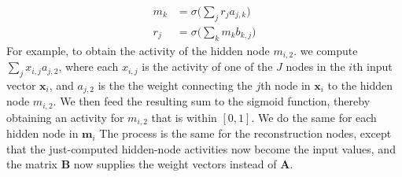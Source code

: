 \begin{align}
\label{eq:sig-m-ac}
m_{k} &= \sigma\big(\sum_{j} r_{j} a_{j,k}\big) \\
\label{eq:sig-r-ac}
r_{j} &= \sigma\big(\sum_{k}  m_{k} b_{k,j} \big)
\end{align}
For example, to obtain the activity of the hidden node $m_{i,2}$.
we compute $\sum_{j} x_{i,j} a_{j,2}$, where each $x_{i,j}$ is the activity of one of the $J$ nodes in the $i$th input vector $\textbf{x}_i$, and $a_{j,2}$ is the the weight connecting the $j$th node in $\textbf{x}_i$ to the hidden node $m_{i,2}$.
We then feed the resulting sum to the sigmoid function, thereby obtaining an activity for $m_{i,2}$ that is within $[0,1]$. 
We do the same for each hidden node in $\textbf{m}_i$
The process is the same for the reconstruction nodes, except that the just-computed hidden-node activities now become the input values, and the matrix $\textbf{B}$ now supplies the weight vectors instead of $\textbf{A}$.

